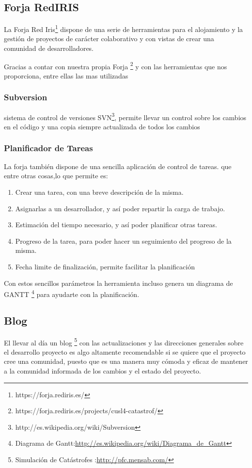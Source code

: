 \subsection*{Forja RedIRIS}
La Forja Red Iris\footnote{https://forja.rediris.es/} dispone de una serie de
herramientas para el alojamiento y la gestión de proyectos de carácter
colaborativo y con vistas de crear una comunidad de desarrolladores.

Gracias a contar con nuestra propia Forja
\footnote{https://forja.rediris.es/projects/cusl4-catastrof/} y con las
herramientas que nos proporciona, entre ellas las mas utilizadas 
\subsubsection*{Subversion}
sistema de control de versiones
SVN\footnote{http://es.wikipedia.org/wiki/Subversion}, permite llevar un
control sobre los cambios en el código y una copia siempre actualizada de
todos los cambios
\subsubsection*{Planificador de Tareas}
La forja también dispone de una sencilla aplicación de control de tareas.
que entre otras cosas,lo que permite es:
\begin{enumerate}
 \item Crear una tarea, con una breve descripción de la misma.
 \item Asignarlas a un desarrollador, y así poder repartir la carga de trabajo.
 \item Estimación del tiempo necesario, y así poder planificar otras tareas.
 \item Progreso de la tarea, para poder hacer un seguimiento del progreso de la
misma.
 \item Fecha limite de finalización, permite facilitar la planificación
\end{enumerate}
Con estos sencillos parámetros la herramienta incluso genera un diagrama de
GANTT
\footnote{Diagrama de
Gantt:\url{http://es.wikipedia.org/wiki/Diagrama_de_Gantt}} para ayudarte con
la planificación.

\subsection*{Blog}
El llevar al día un blog \footnote{Simulación de Catástrofes
:\url{http://pfc.mensab.com/}} con las actualizaciones y las direcciones
generales sobre el desarrollo proyecto es algo altamente recomendable si se
quiere que el proyecto cree una comunidad, puesto que es una manera muy cómoda y
eficaz de mantener a la comunidad informada de los cambios y el estado del
proyecto.

